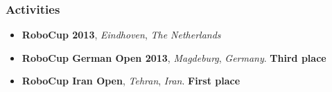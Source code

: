 \begin{frame}
	\frametitle{Activities}
	
	\begin{center}
	\end{center}
	
	\begin{itemize}
		\item \textbf{RoboCup 2013}, \emph{Eindhoven}, \emph{The Netherlands}
		\item \textbf{RoboCup German Open 2013}, \emph{Magdeburg}, \emph{Germany}. \textbf{Third place}
		\item \textbf{RoboCup Iran Open}, \emph{Tehran}, \emph{Iran}. \textbf{First place}
	\end{itemize}
\end{frame}
